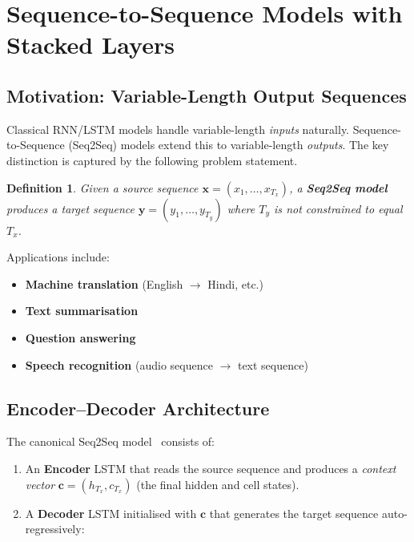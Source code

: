 \documentclass[12pt,a4paper]{article}
\newtheorem{definition}{Definition}[section]
\begin{document}
\section{Sequence-to-Sequence Models with Stacked Layers}
\label{sec:seq2seq}

\subsection{Motivation: Variable-Length Output Sequences}
\label{subsec:seq2seq_motivation}

Classical RNN/LSTM models handle variable-length \emph{inputs} naturally.
Sequence-to-Sequence (Seq2Seq) models extend this to variable-length
\emph{outputs}.  The key distinction is captured by the following problem
statement.

\begin{definition}
  \label{def:seq2seq}
  Given a source sequence $\mathbf{x} = (x_1, \ldots, x_{T_x})$, a
  \textbf{Seq2Seq model} produces a target sequence
  $\mathbf{y} = (y_1, \ldots, y_{T_y})$ where $T_y$ is \emph{not} constrained
  to equal $T_x$.
\end{definition}

Applications include:
\begin{itemize}
  \item \textbf{Machine translation} (English $\to$ Hindi, etc.)
  \item \textbf{Text summarisation}
  \item \textbf{Question answering}
  \item \textbf{Speech recognition} (audio sequence $\to$ text sequence)
\end{itemize}

\subsection{Encoder--Decoder Architecture}
\label{subsec:enc_dec}

The canonical Seq2Seq model~\cite{sutskever2014sequence} consists of:

\begin{enumerate}
  \item An \textbf{Encoder} LSTM that reads the source sequence and produces a
        \emph{context vector} $\mathbf{c} = (h_{T_x}, c_{T_x})$ (the final
        hidden and cell states).
  \item A \textbf{Decoder} LSTM initialised with $\mathbf{c}$ that generates
        the target sequence auto-regressively:
\end{enumerate}
\end{document}
